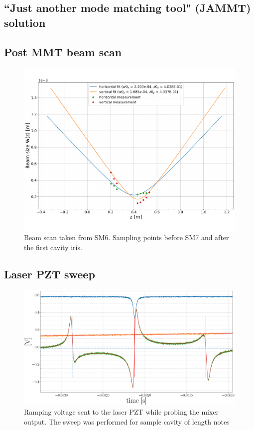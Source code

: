 \subsection{``Just another mode matching tool" (JAMMT) solution}

\subsection{Post MMT beam scan}

\begin{figure}[H]
\includegraphics[width=\textwidth]{figs/ALGAAS/beam_scans/01_12_2021_postMMT.pdf}
\caption{Beam scan taken from SM6. Sampling points before SM7 and after the first cavity iris.}
\label{fig:beam_scan_2021}
\end{figure}

\subsection{Laser PZT sweep}

\begin{figure}[H]
	\includegraphics[width=\textwidth]{figs/ALGAAS/pdh_measured.pdf}
	\caption{Ramping voltage sent to the laser PZT while probing the mixer output. The sweep was performed for sample cavity of length notes}
\label{fig:pdh_measured}
\end{figure}


